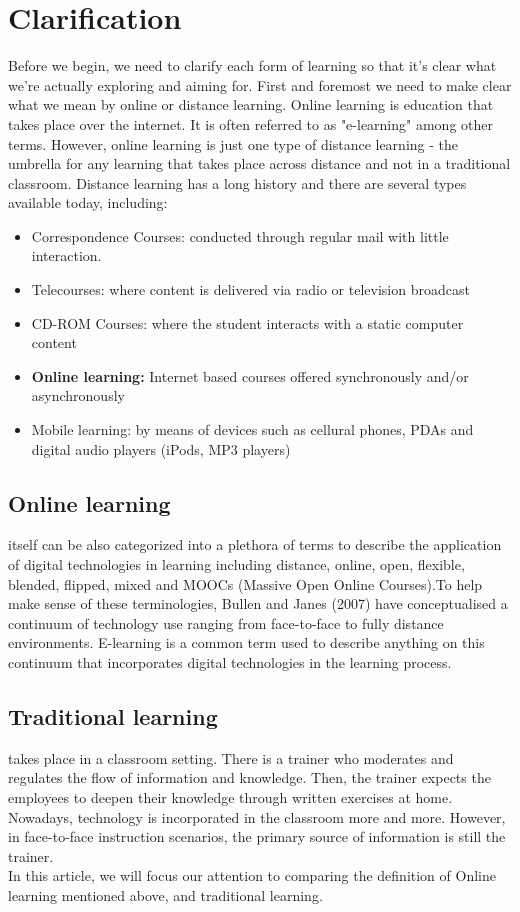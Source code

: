 \documentclass[10pt,twoside,english,a4paper]{article}
\begin{document}
\section{Clarification}
Before we begin, we need to clarify each form of learning so that it's clear what we're actually exploring and aiming for. First and foremost we need to make clear what we mean by online or distance learning. Online learning is education that takes place over the internet. It is often referred to as "e-learning" among other terms. However, online learning is just one type of distance learning - the umbrella for any learning that takes place across distance and not in a traditional classroom. Distance learning has a long history and there are several types available today, including:\cite{introductiontoonlinelearning}
\begin{itemize}
    \item Correspondence Courses: conducted through regular mail with little interaction.
    \item Telecourses: where content is delivered via radio or television broadcast
    \item CD-ROM Courses: where the student interacts with a static computer content
    \item \textbf{Online learning:} Internet based courses offered synchronously and/or asynchronously
    \item Mobile learning: by means of devices such as cellural phones, PDAs and digital audio players (iPods, MP3 players) 
    
\end{itemize}
\subsection{Online learning} itself can be also categorized into a plethora of terms to describe the application of digital technologies in learning including distance, online, open, flexible, blended, flipped, mixed and MOOCs (Massive Open Online Courses).\cite{inbook}To help make sense of these terminologies, Bullen and Janes (2007)\cite{Bullen} have conceptualised a continuum of technology use ranging from face-to-face to fully distance environments. E-learning is a common term used to describe anything on this continuum that incorporates digital technologies in the learning process\cite{Nichols}.
\subsection{Traditional learning} takes place in a classroom setting. There is a trainer who moderates and regulates the flow of information and knowledge. Then, the trainer expects the employees to deepen their knowledge through written exercises at home. Nowadays, technology is incorporated in the classroom more and more. However, in face-to-face instruction scenarios, the primary source of information is still the trainer.\cite{traditionallearning} \\
In this article, we will focus our attention to comparing the definition of Online learning mentioned above, and traditional learning.
\end{document}
